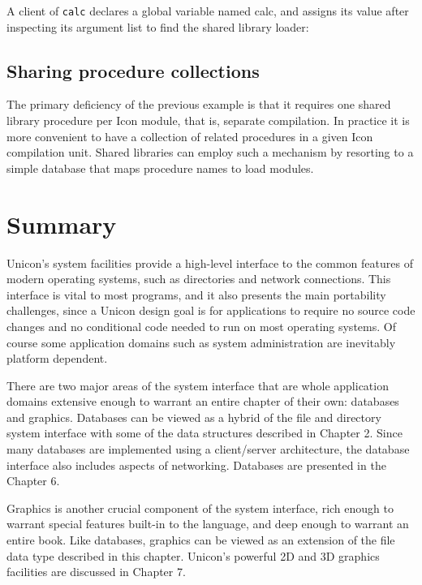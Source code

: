 A client of {\texttt{calc}} declares a global variable named {\textrm{calc}},
and assigns its value after inspecting its argument list to find the shared
library loader:


\subsection*{Sharing procedure collections}

The primary deficiency of the previous example is that it requires one
shared library procedure per Icon module, that is, separate
compilation. In practice it is more convenient to have a collection of
related procedures in a given Icon compilation unit. Shared libraries
can employ such a mechanism by resorting to a simple database that
maps procedure names to load modules.

\section{Summary}

Unicon's system facilities provide a high-level interface to the
common features of modern operating systems, such as directories and
network connections. This interface is vital to most programs, and it
also presents the main portability challenges, since a Unicon design
goal is for applications to require no source code
changes and no conditional code needed to run on most operating
systems. Of course some application domains such as system
administration are inevitably platform dependent.

There are two major areas of the system interface that are whole application
domains extensive enough to warrant an entire chapter of their own:
databases and graphics. Databases can be viewed as a hybrid of
the file and directory system interface with some of the data structures
described in Chapter 2. Since many databases are implemented using a
client/server architecture, the database interface also includes aspects of
networking. Databases are presented in the Chapter 6.

Graphics is another crucial component of the system interface, rich
enough to warrant special features built-in to the language, and deep
enough to warrant an entire book. Like databases, graphics can be
viewed as an extension of the file data type described in this
chapter.  Unicon's powerful 2D and 3D graphics facilities are
discussed in Chapter 7.

